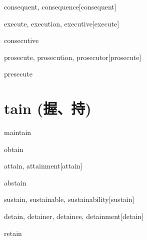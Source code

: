 \begin{RefWord}{consequent, consequence}[consequent]
\end{RefWord}

\begin{RefWord}{execute, execution, executive}[execute]
\end{RefWord}

\begin{RefWord}{consecutive}
\end{RefWord}

\begin{RefWord}{prosecute, prosecution, prosecutor}[prosecute]
\end{RefWord}

\begin{RefWord}{presecute}
\end{RefWord}

\section{tain (握、持)}

\begin{RefWord}{maintain}
\end{RefWord}

\begin{RefWord}{obtain}
\end{RefWord}

\begin{RefWord}{attain, attainment}[attain]
\end{RefWord}

\begin{RefWord}{abstain}
\end{RefWord}

\begin{RefWord}{sustain, sustainable, sustainability}[sustain]
\end{RefWord}

\begin{RefWord}{detain, detainer, detainee, detainment}[detain]
\end{RefWord}

\begin{RefWord}{retain}
\end{RefWord}
